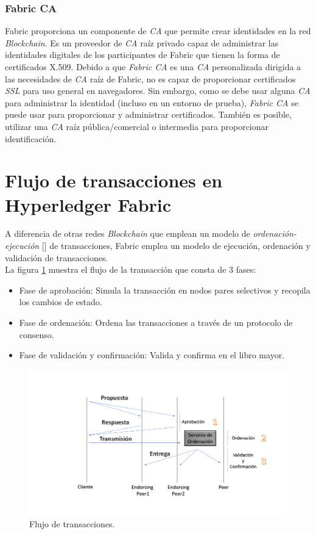 \subsubsection{Fabric CA}
Fabric proporciona un componente de \emph{CA} que permite crear identidades en la red \emph{Blockchain}. Es un proveedor de \emph{CA} ra\'iz privado capaz de administrar las identidades digitales de los participantes de Fabric que tienen la forma de certificados X.509. Debido a que \emph{Fabric CA} es una \emph{CA} personalizada dirigida a las necesidades de \emph{CA} ra\'iz de Fabric, no es capaz de proporcionar certificados \emph{SSL} para uso general en navegadores. Sin embargo, como se debe usar alguna \emph{CA} para administrar la identidad (incluso en un entorno de prueba), \emph{Fabric CA} se puede usar para proporcionar y administrar certificados. Tambi\'en es posible, utilizar una \emph{CA} ra\'iz p\'ublica/comercial o intermedia para proporcionar identificaci\'on.


\section{Flujo de transacciones en Hyperledger Fabric}
A diferencia de otras redes \emph{Blockchain} que emplean un modelo de \emph{ordenaci\'on-ejecución} [\cite{vukolic2017rethinking}] de transacciones, Fabric emplea un modelo de ejecuci\'on, ordenaci\'on y validaci\'on de transacciones.\\ 

La figura \ref{FlujoTransacciones} muestra el flujo de la transacci\'on que consta de 3 fases:
\begin{itemize}
\item[1] Fase de aprobaci\'on: Simula la transacci\'on en nodos pares selectivos y recopila los cambios de estado.
\item[2] Fase de ordenaci\'on: Ordena las transacciones a trav\'es de un protocolo de consenso.
\item[3] Fase de validaci\'on y confirmaci\'on: Valida y confirma en el libro mayor.
\end{itemize}



\begin{figure}[h]
\centering
\includegraphics[width=0.6\linewidth]{Graphics/FlujoTransacciones.png}
\caption{Flujo de transacciones.}
\label{FlujoTransacciones}
\end{figure}

